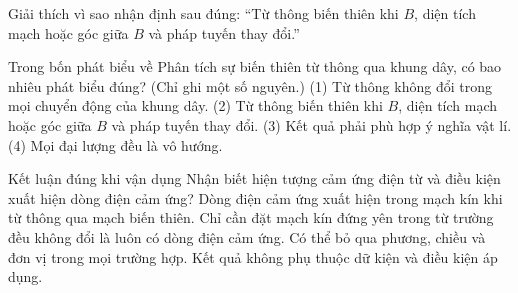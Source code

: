 \begin{bt}
Giải thích vì sao nhận định sau đúng: “Từ thông biến thiên khi $B$, diện tích mạch hoặc góc giữa $B$ và pháp tuyến thay đổi.”
\end{bt}

\begin{ex}
Trong bốn phát biểu về Phân tích sự biến thiên từ thông qua khung dây, có bao nhiêu phát biểu đúng? (Chỉ ghi một số nguyên.) (1) Từ thông không đổi trong mọi chuyển động của khung dây. (2) Từ thông biến thiên khi $B$, diện tích mạch hoặc góc giữa $B$ và pháp tuyến thay đổi. (3) Kết quả phải phù hợp ý nghĩa vật lí. (4) Mọi đại lượng đều là vô hướng.
\end{ex}

\begin{ex}
Kết luận đúng khi vận dụng Nhận biết hiện tượng cảm ứng điện từ và điều kiện xuất hiện dòng điện cảm ứng?
\choice
{\True Dòng điện cảm ứng xuất hiện trong mạch kín khi từ thông qua mạch biến thiên.}
{Chỉ cần đặt mạch kín đứng yên trong từ trường đều không đổi là luôn có dòng điện cảm ứng.}
{Có thể bỏ qua phương, chiều và đơn vị trong mọi trường hợp.}
{Kết quả không phụ thuộc dữ kiện và điều kiện áp dụng.}
\end{ex}

